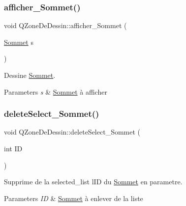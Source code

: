 \subsubsection{\texorpdfstring{afficher\+\_\+\+Sommet()}{afficher\_Sommet()}}
{\footnotesize\ttfamily void Q\+Zone\+De\+Dessin\+::afficher\+\_\+\+Sommet (\begin{DoxyParamCaption}\item[{\hyperlink{classSommet}{Sommet}}]{s }\end{DoxyParamCaption})}



Dessine \hyperlink{classSommet}{Sommet}. 


\begin{DoxyParams}{Parameters}
{\em s} & \hyperlink{classSommet}{Sommet} \`{a} afficher \\
\hline
\end{DoxyParams}
\mbox{\label{classQZoneDeDessin_ac611d0d33fd0f84494c0e57a4a476da1}} 
\subsubsection{\texorpdfstring{delete\+Select\+\_\+\+Sommet()}{deleteSelect\_Sommet()}}
{\footnotesize\ttfamily void Q\+Zone\+De\+Dessin\+::delete\+Select\+\_\+\+Sommet (\begin{DoxyParamCaption}\item[{int}]{ID }\end{DoxyParamCaption})}



Supprime de la selected\+\_\+list l\textquotesingle{}ID du \hyperlink{classSommet}{Sommet} en parametre. 


\begin{DoxyParams}{Parameters}
{\em ID} & \hyperlink{classSommet}{Sommet} \`{a} enlever de la liste \\
\hline
\end{DoxyParams}
\mbox{\label{classQZoneDeDessin_a6cb201a39b3c7a12dfb5cd39bc3e8063}} 
